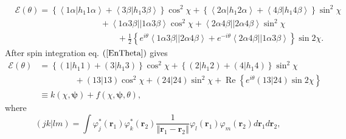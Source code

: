 \documentclass[aps,preprint]{revtex4}%
\begin{document}
\begin{align}
&  \mathcal{E}\left(  \theta\right)  =\left\{  \left\langle 1\alpha\left\vert
h_{1}1\alpha\right.  \right\rangle +\left\langle 3\beta\left\vert h_{1}%
3\beta\right.  \right\rangle \right\}  \cos^{2}\chi+\left\{  \left\langle
2\alpha\left\vert h_{1}2\alpha\right.  \right\rangle +\left\langle
4\beta\left\vert h_{1}4\beta\right.  \right\rangle \right\}  \sin^{2}%
\chi\nonumber\\
&  \qquad\qquad\qquad\qquad\qquad+\left\langle 1\alpha3\beta\right\vert
\left\vert 1\alpha3\beta\right\rangle \cos^{2}\chi+\left\langle 2\alpha
4\beta\right\vert \left\vert 2\alpha4\beta\right\rangle \sin^{2}%
\chi\nonumber\\
&  \qquad\qquad\qquad\qquad\qquad\qquad+\frac{1}{2}\left\{  e^{i\theta
}\left\langle 1\alpha3\beta\right\vert \left\vert 2\alpha4\beta\right\rangle
+e^{-i\theta}\left\langle 2\alpha4\beta\right\vert \left\vert 1\alpha
3\beta\right\rangle \right\}  \sin2\chi. \label{EnTheta}%
\end{align}
After spin integration eq. $\left(  \ref{EnTheta}\right)  $ gives
\begin{align}
\mathcal{E}\left(  \theta\right)   &  =\left\{  \left(  1\left\vert
h_{1}1\right.  \right)  +\left(  3\left\vert h_{1}3\right.  \right)  \right\}
\cos^{2}\chi+\left\{  \left(  2\left\vert h_{1}2\right.  \right)  +\left(
4\left\vert h_{1}4\right.  \right)  \right\}  \sin^{2}\chi\nonumber\\
&  \qquad\qquad\,+\left(  \left.  13\right\vert 13\right)  \cos^{2}%
\chi+\left(  \left.  24\right\vert 24\right)  \sin^{2}\chi+\operatorname{Re}%
\left\{  e^{i\theta}\left(  \left.  13\right\vert 24\right)  \sin2\chi\right\}
\nonumber\\
&  \equiv k\left(  \chi,\boldsymbol{\psi}\right)  +f\left(  \chi
,\boldsymbol{\psi},\theta\right)  ,
\end{align}
where
\begin{equation}
\left(  \left.  jk\right\vert lm\right)  =\int\varphi_{j}^{\ast}\left(
\boldsymbol{r}_{1}\right)  \varphi_{k}^{\ast}\left(  \boldsymbol{r}%
_{2}\right)  \frac{1}{\left\Vert \boldsymbol{r}_{1}-\boldsymbol{r}%
_{2}\right\Vert }\varphi_{l}\left(  \boldsymbol{r}_{1}\right)  \varphi
_{m}\left(  \boldsymbol{r}_{2}\right)  d\boldsymbol{r}_{1}d\boldsymbol{r}_{2},
\end{equation}
%
\end{document}

